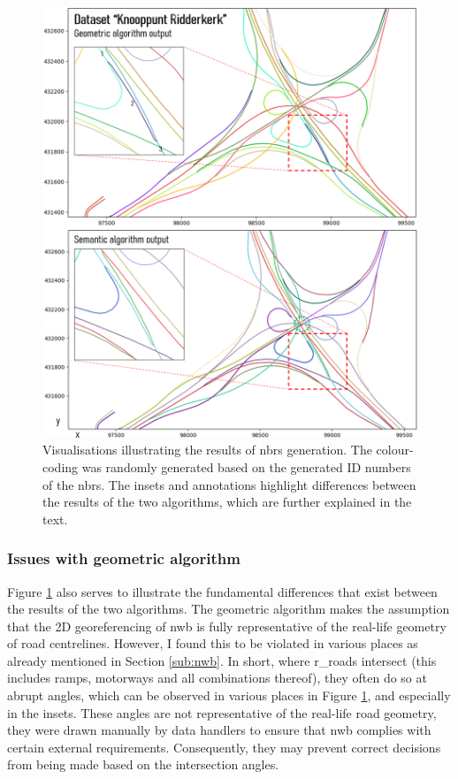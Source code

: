 \begin{figure}
    \centering
    \includegraphics[width=\linewidth]{final_report/figs/nbrsgeneration0.png}
    \caption[Renders illustrating the results of NBRS generation]{Visualisations illustrating the results of \ac{nbrs} generation. The colour-coding was randomly generated based on the generated ID numbers of the \ac{nbrs}. The insets and annotations highlight differences between the results of the two algorithms, which are further explained in the text.}
    \label{fig:nbrsgeneration0}
\end{figure}

\subsubsection{Issues with geometric algorithm}

Figure \ref{fig:nbrsgeneration0} also serves to illustrate the fundamental differences that exist between the results of the two algorithms. The geometric algorithm makes the assumption that the 2D georeferencing of \ac{nwb} is fully representative of the real-life geometry of road centrelines. However, I found this to be violated in various places as already mentioned in Section \ref{sub:nwb}. In short, where \ac{r_road}s intersect (this includes ramps, motorways and all combinations thereof), they often do so at abrupt angles, which can be observed in various places in Figure \ref{fig:nbrsgeneration0}, and especially in the insets. These angles are not representative of the real-life road geometry, they were drawn manually by data handlers to ensure that \ac{nwb} complies with certain external requirements. Consequently, they may prevent correct decisions from being made based on the intersection angles.

